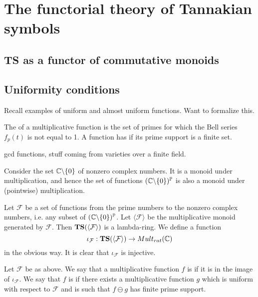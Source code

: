 
\section{The functorial theory of Tannakian symbols}



\subsection{\textbf{TS} as a functor of commutative monoids}

\subsection{Uniformity conditions}
Recall examples of uniform and almost uniform functions. Want to formalize this.

\begin{definition}
The  of a multiplicative function is the set of primes for which the Bell series $f_p(t)$ is not equal to 1. A function has  if its prime support is a finite set. 
\end{definition}

\begin{example}
gcd functions, stuff coming from varieties over a finite field.
\end{example}

Consider the set $\mathbb{C} \backslash \{ 0\}$ of nonzero complex numbers. It is a monoid under multiplication, and hence the set of functions $(\mathbb{C} \backslash \{ 0 \})^{\mathbb{P}}$ is also a monoid under (pointwise) multiplication.

Let $\mathcal{F}$ be a set of functions from the prime numbers to the nonzero complex numbers, i.e. any subset of $(\mathbb{C} \backslash \{ 0 \})^{\mathbb{P}}$. Let $\langle \mathcal{F} \rangle$ be the multiplicative monoid generated by $\mathcal{F}$. Then $\mathbf{TS}(\langle \mathcal{F} \rangle)$ is a lambda-ring. We define a function
$$ \iota_{\mathcal{F}} : \mathbf{TS}(\langle \mathcal{F} \rangle) \to Mult_{rat}(\mathbb{C})  $$
in the obvious way. It is clear that $\iota_{\mathcal{F}}$ is injective.



\begin{definition}
Let $\mathcal{F}$ be as above. We say that a multiplicative function $f$ is  if it is in the image of $\iota_{\mathcal{F}}$. We say that $f$ is  if there exists a multiplicative function $g$ which is uniform with respect to $\mathcal{F}$ and is such that $f \ominus g$ has finite prime support. 
\end{definition}

